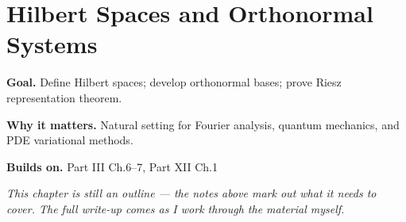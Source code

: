 \chapter{Hilbert Spaces and Orthonormal Systems}
\label{ch:12-functional-analysis-and-spectral-theory-02}

\begin{chapterintro}
\textbf{Goal.} Define Hilbert spaces; develop orthonormal bases; prove Riesz representation theorem.

\textbf{Why it matters.} Natural setting for Fourier analysis, quantum mechanics, and PDE variational methods.

\textbf{Builds on.} Part III Ch.6–7, Part XII Ch.1
\end{chapterintro}

\textit{This chapter is still an outline --- the notes above mark out what it needs to cover. The full write-up comes as I work through the material myself.}
